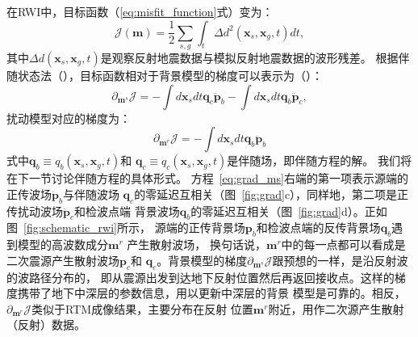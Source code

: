 在RWI中，目标函数（\ref{eq:misfit_function}式）变为：
\begin{equation}
    \mathcal{J}(\mathbf{m})=\frac{1}{2}\sum_{s,g}\int_t\Delta d^2(\mathbf{x}_s,\mathbf{x}_g,t)dt,
	\label{eq:misfit_function1}
\end{equation}
其中$\Delta d(\mathbf{x}_s,\mathbf{x}_g,t)$是观察反射地震数据与模拟反射地震数据的波形残差。
根据伴随状态法（），目标函数相对于背景模型的梯度可以表示为（）：
\begin{equation}
	\partial_{\mathbf{m}^s}\mathcal{J}=-\int d\mathbf{x}_sdt\mathbf{q}_c\ddot{\mathbf{p}}_b
	-\int d\mathbf{x}_sdt\mathbf{q}_b\ddot{\mathbf{p}}_c,
	\label{eq:grad_ms}
\end{equation}
扰动模型对应的梯度为：
\begin{equation}
	\partial_{\mathbf{m}^r}\mathcal{J}=-\int d\mathbf{x}_sdt\mathbf{q}_b\ddot{\mathbf{p}}_b
\end{equation}
式中$\mathbf{q}_b\equiv q_b(\mathbf{x}_s,\mathbf{x}_g,t)$和
$\mathbf{q}_c\equiv q_c(\mathbf{x}_s,\mathbf{x}_g,t)$是伴随场，即伴随方程的解。
我们将在下一节讨论伴随方程的具体形式。
方程~\ref{eq:grad_ms}右端的第一项表示源端的正传波场$\ddot{\mathbf{p}}_b$与伴随波场
$\mathbf{q}_c$的零延迟互相关（图~\ref{fig:grad}c），同样地，第二项是正传扰动波场$\ddot{\mathbf{p}}_c$和检波点端
背景波场$\mathbf{q}_b$的零延迟互相关（图~\ref{fig:grad}d）。正如图~\ref{fig:schematic_rwi}所示，
源端的正传背景场$\mathbf{p}_b$和检波点端的反传背景场$\mathbf{q}_b$遇到模型的高波数成分$\mathbf{m}^r$
产生散射波场，
换句话说，$\mathbf{m}^r$中的每一点都可以看成是二次震源产生散射波场$\mathbf{p}_c$和
$\mathbf{q}_c$。背景模型的梯度$\partial_{\mathbf{m}^s}\mathcal{J}$跟预想的一样，是沿反射波的波路径分布的，
即从震源出发到达地下反射位置然后再返回接收点。这样的梯度携带了地下中深层的参数信息，用以更新中深层的背景
模型是可靠的。相反，$\partial_{\mathbf{m}^r}\mathcal{J}$类似于RTM成像结果，主要分布在反射
位置$\mathbf{m}^r$附近，用作二次源产生散射（反射）数据。

\vspace{0.9cm}
